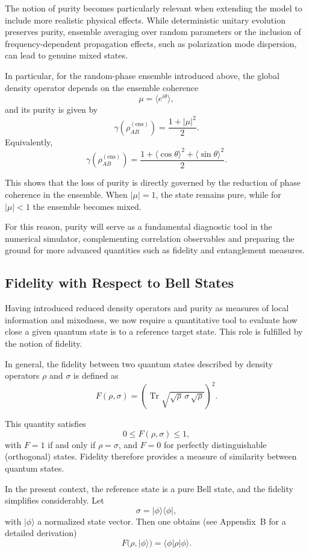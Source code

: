 \documentclass[a4paper]{article}
\begin{document}
The notion of purity becomes particularly relevant when extending the model to include more realistic physical effects. 
While deterministic unitary evolution preserves purity, ensemble averaging over random parameters or the inclusion of frequency-dependent propagation effects, such as polarization mode dispersion, can lead to genuine mixed states. 

In particular, for the random-phase ensemble introduced above, the global density operator depends on the ensemble coherence
\[
\mu = \langle e^{i\theta} \rangle,
\]
and its purity is given by
\[
\gamma\!\left(\rho_{AB}^{(\mathrm{ens})}\right)
=
\frac{1 + |\mu|^2}{2}.
\]
Equivalently,
\[
\gamma\!\left(\rho_{AB}^{(\mathrm{ens})}\right)
=
\frac{1 + \langle \cos\theta \rangle^2 + \langle \sin\theta \rangle^2}{2}.
\]

This shows that the loss of purity is directly governed by the reduction of phase coherence in the ensemble. When $|\mu|=1$, the state remains pure, while for $|\mu|<1$ the ensemble becomes mixed.

For this reason, purity will serve as a fundamental diagnostic tool in the numerical simulator, complementing correlation observables and preparing the ground for more advanced quantities such as fidelity and entanglement measures.

\subsection{Fidelity with Respect to Bell States}

Having introduced reduced density operators and purity as measures of local information and mixedness, we now require a quantitative tool to evaluate how close a given quantum state is to a reference target state. This role is fulfilled by the notion of fidelity.

In general, the fidelity between two quantum states described by density operators $\rho$ and $\sigma$ is defined as
\[
F(\rho,\sigma)
=
\left(\operatorname{Tr}\sqrt{\sqrt{\rho}\,\sigma\,\sqrt{\rho}}\right)^2.
\]

This quantity satisfies
\[
0 \le F(\rho,\sigma) \le 1,
\]
with $F=1$ if and only if $\rho = \sigma$, and $F=0$ for perfectly distinguishable (orthogonal) states. Fidelity therefore provides a measure of similarity between quantum states.

\medskip

In the present context, the reference state is a pure Bell state, and the fidelity simplifies considerably. Let
\[
\sigma = |\phi\rangle\langle\phi|,
\]
with $|\phi\rangle$ a normalized state vector. Then one obtains (see Appendix~B for a detailed derivation)
\[
F(\rho, |\phi\rangle)
=
\langle \phi | \rho | \phi \rangle.
\]
\end{document}
